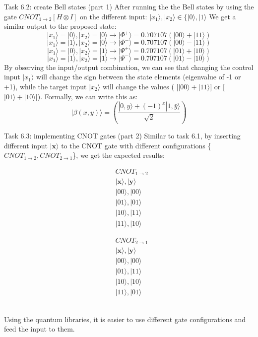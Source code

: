 \documentclass[aspectratio=169]{beamer}
\begin{document}
\begin{frame}{Task 6.2: create Bell states (part 1)}
After running the the Bell states by using the gate $CNOT_{1\xrightarrow{}2} [H \otimes I]$ on the different input: $|x_1\rangle, |x_2\rangle \in \{|0\rangle, |1\rangle$
We get a similar output to the proposed state:
\[
|x_1\rangle = |0\rangle, |x_2\rangle = |0\rangle \xrightarrow \quad |\Phi^+\rangle = 0.707107 (|00\rangle + |11\rangle)
\]
\[
|x_1\rangle = |1\rangle, |x_2\rangle = |0\rangle \xrightarrow \quad |\Phi^-\rangle = 0.707107 (|00\rangle - |11\rangle)
\]
\[
|x_1\rangle = |0\rangle, |x_2\rangle = |1\rangle \xrightarrow \quad |\Psi^+\rangle = 0.707107 (|01\rangle + |10\rangle)
\]
\[
|x_1\rangle = |1\rangle, |x_2\rangle = |1\rangle \xrightarrow \quad |\Psi^-\rangle = 0.707107 (|01\rangle - |10\rangle)
\]
By observing the input/output combination,  we can see that changing the control input $|x_1\rangle$ will change the sign between the state elements (eigenvalue of -1 or +1), while the target input $|x_2\rangle$ will change the values ( [$|00\rangle + |11\rangle$] or [$|01\rangle + |10\rangle$]). Formally, we can write this as:
\[
|\beta(x, y)\rangle = \left( \frac{|0, y\rangle + (-1)^x |1, \bar{y}\rangle}{\sqrt{2}} \right)
\]
\end{frame}

\begin{frame}{Task 6.3: implementing CNOT gates (part 2)}
Similar to task 6.1, by inserting different input $|\textbf{x}\rangle$ to the CNOT gate with different configurations \{$CNOT_{1\xrightarrow{}2}, CNOT_{2\xrightarrow{}1}$\}, we get the expected results:\\
\begin{minipage}{0.45\textwidth}
    \begin{align*}
        & CNOT_{1\xrightarrow{}2} \\
        & |\textbf{x}\rangle, |\textbf{y}\rangle\\
        & |00\rangle, |00\rangle \\
        & |01\rangle, |01\rangle \\
        & |10\rangle, |11\rangle \\
        & |11\rangle, |10\rangle
    \end{align*}
\end{minipage}
\hfill
\begin{minipage}{0.45\textwidth}
    \begin{align*}
        & CNOT_{2\xrightarrow{}1} \\
        & |\textbf{x}\rangle, |\textbf{y}\rangle\\
        & |00\rangle, |00\rangle \\
        & |01\rangle, |11\rangle \\
        & |10\rangle, |10\rangle \\
        & |11\rangle, |01\rangle
    \end{align*}
\end{minipage}\\
Using the quantum libraries, it is easier to use different gate configurations and feed the input to them.

\end{frame}
\end{document}
